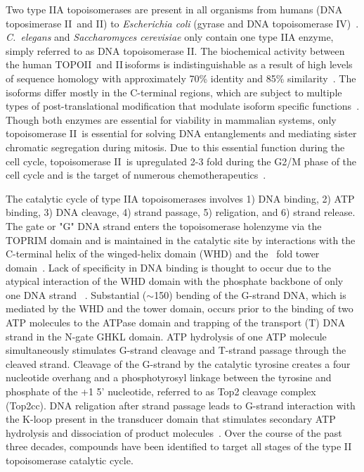 \documentclass[12pt]{article}
\begin{document}
Two type IIA topoisomerases are present in all organisms from humans (DNA toposimerase II\textalpha\ and II\textbeta) to {\it Escherichia coli} (gyrase and DNA topoisomerase IV)~\cite{Wang:2002hh}. {\it C.~elegans} and {\it Saccharomyces cerevisiae} only contain one type IIA enzyme, simply referred to as DNA topoisomerase II. The biochemical activity between the human TOPOII\textalpha\ and II\textbeta\,isoforms is indistinguishable as a result of high levels of sequence homology with approximately 70\% identity and 85\% similarity~\cite{Austin:1995ua}. The isoforms differ mostly in the C-terminal regions, which are subject to multiple types of post-translational modification that modulate isoform specific functions~\cite{Linka:2007jo}. Though both enzymes are essential for viability in mammalian systems, only topoisomerase II\textalpha\ is essential for solving DNA entanglements and mediating sister chromatic segregation during mitosis. Due to this essential function during the cell cycle, topoisomerase II\textalpha\ is upregulated 2-3 fold during the G2/M phase of the cell cycle and is the target of numerous chemotherapeutics~\cite{Wu:2013dia}. 

\vspace{5pt}

The catalytic cycle of type IIA topoisomerases involves 1) DNA binding, 2) ATP binding, 3) DNA cleavage, 4) strand passage, 5) religation, and 6) strand release. The gate or "G" DNA strand enters the topoisomerase holenzyme via the TOPRIM domain and is maintained in the catalytic site by interactions with the C-terminal helix of the winged-helix domain (WHD) and the \textalpha\textbeta\ fold tower domain~\cite{Chang:2013bn,Dong:2007ita}. Lack of specificity in DNA binding is thought to occur due to the atypical interaction of the WHD domain with the phosphate backbone of only one DNA strand ~\cite{Dong:2007ita}. Substantial ($\sim$150\degree) bending of the G-strand DNA, which is mediated by the WHD and the tower domain, occurs prior to the binding of two ATP molecules to the ATPase domain and trapping of the transport (T) DNA strand in the N-gate GHKL domain. ATP hydrolysis of one ATP molecule simultaneously stimulates G-strand cleavage and T-strand passage through the cleaved strand. Cleavage of the G-strand by the catalytic tyrosine creates a four nucleotide overhang and a phosphotyrosyl linkage between the tyrosine and phosphate of the +1 5' nucleotide, referred to as Top2 cleavage complex (Top2cc). DNA religation after strand passage leads to G-strand interaction with the K-loop present in the transducer domain that stimulates secondary ATP hydrolysis and dissociation of product molecules~\cite{Schmidt:2012eu}. Over the course of the past three decades, compounds have been identified to target all stages of the type II topoisomerase catalytic cycle. 
\vspace{-10pt}
\end{document}
